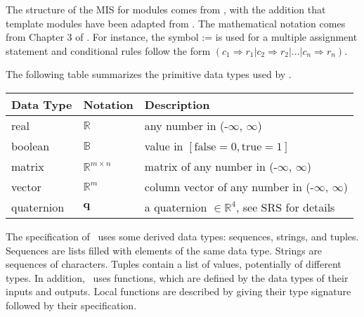 \documentclass[12pt, titlepage]{article}
\begin{document}

The structure of the MIS for modules comes from \citet{HoffmanAndStrooper1995}, with the addition
that template modules have been adapted from \cite{GhezziEtAl2003}.  The mathematical notation comes
from Chapter 3 of \citet{HoffmanAndStrooper1995}.  For instance, the symbol := is used for a
multiple assignment statement and conditional rules follow the form $(c_1 \Rightarrow r_1 | c_2
\Rightarrow r_2 | ... | c_n \Rightarrow r_n )$.

The following table summarizes the primitive data types used by \progname.

\begin{center}
\renewcommand{\arraystretch}{1.2}
\noindent
\begin{tabular}{l l p{7.5cm}}
\toprule
\textbf{Data Type} & \textbf{Notation} & \textbf{Description}\\
\midrule
real & $\mathbb{R}$ & any number in (-$\infty$, $\infty$)\\
boolean & $\mathbb{B}$ & value in $[\text{false}=0, \text{true}=1]$\\
matrix & $\mathbb{R}^{m \times n}$ & matrix of any number in (-$\infty$, $\infty$)\\
vector & $\mathbb{R}^{m}$ & column vector of any number in (-$\infty$, $\infty$)\\
quaternion & $\mathbf{q}$ & a quaternion $\in \mathbb{R}^4$, see SRS for details\\
\bottomrule
\end{tabular}
\end{center}

\noindent
The specification of \progname \ uses some derived data types: sequences, strings, and tuples.
Sequences are lists filled with elements of the same data type. Strings are sequences of characters.
Tuples contain a list of values, potentially of different types. In addition, \progname \ uses
functions, which are defined by the data types of their inputs and outputs. Local functions are
described by giving their type signature followed by their specification.
\end{document}
